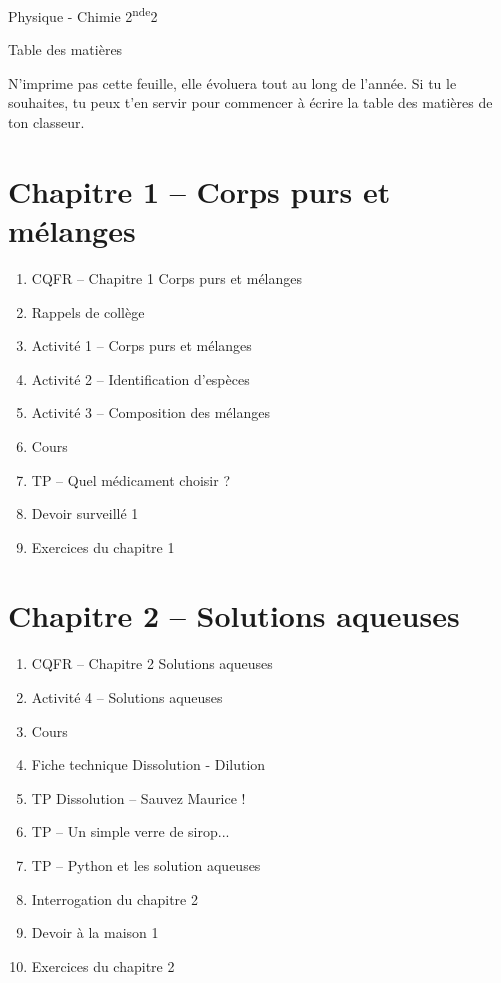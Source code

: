 \documentclass[12pt,a4paper]{article}
\begin{document}
\begin{header}
Physique - Chimie 2\textsuperscript{nde}2

Table des matières
\end{header}

N'imprime pas cette feuille, elle évoluera tout au long de l'année.
Si tu le souhaites, tu peux t'en servir pour commencer à écrire la table des matières de ton classeur.

\section*{Chapitre 1 -- Corps purs et mélanges}

\begin{enumerate}
\item CQFR -- Chapitre 1 Corps purs et mélanges
\item Rappels de collège
\item Activité 1 -- Corps purs et mélanges
\item Activité 2 -- Identification d'espèces
\item Activité 3 -- Composition des mélanges
\item Cours
\item TP -- Quel médicament choisir ?
\item Devoir surveillé 1
\item Exercices du chapitre 1
\end{enumerate}

\section*{Chapitre 2 -- Solutions aqueuses}

\begin{enumerate}
\item CQFR -- Chapitre 2 Solutions aqueuses
\item Activité 4 -- Solutions aqueuses
\item Cours
\item Fiche technique Dissolution - Dilution
\item TP Dissolution -- Sauvez Maurice !
\item TP -- Un simple verre de sirop...
\item TP -- Python et les solution aqueuses
\item Interrogation du chapitre 2
\item Devoir à la maison 1
\item Exercices du chapitre 2
\end{enumerate}
\end{document}
